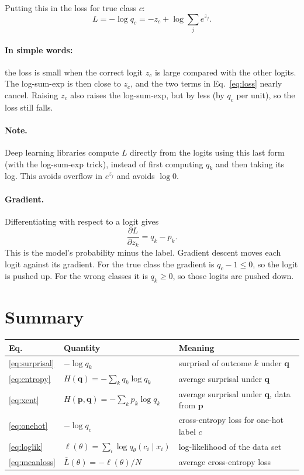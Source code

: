 \documentclass[12pt,a4paper]{article}
\begin{document}
Putting this in the loss for true class $c$:
\begin{equation}
  L = -\log q_c = -z_c + \log \sum_{j} e^{z_j} .
  \label{eq:loss}
\end{equation}
\paragraph{In simple words:} the loss is small when
the correct logit $z_c$ is large compared with the other
logits. The log-sum-exp is then close to $z_c$, and the
two terms in Eq.~\eqref{eq:loss} nearly cancel. Raising
$z_c$ also raises the log-sum-exp, but by less (by $q_c$
per unit), so the loss still falls.

\paragraph{Note.} Deep learning libraries
compute $L$ directly from the logits using this
last form (with the log-sum-exp trick), instead
of first computing $q_k$ and then taking its log.
This avoids overflow in $e^{z_j}$ and avoids $\log 0$.

\paragraph{Gradient.} Differentiating with respect to
a logit gives
\begin{equation}
  \frac{\partial L}{\partial z_k} = q_k - p_k .
  \label{eq:grad}
\end{equation}
This is the model's probability minus the label.
Gradient descent moves each logit against its gradient.
For the true class the gradient is $q_c - 1 \le 0$, so the
logit is pushed up. For the wrong classes it
is $q_k \ge 0$, so those logits are pushed down.

\section{Summary}

\begin{center}
\begin{tabular}{lll}
  \toprule
  Eq. & Quantity & Meaning \\
  \midrule
  \eqref{eq:surprisal} & $-\log q_k$ & surprisal of outcome $k$
  under $\symbf{q}$ \\
  \eqref{eq:entropy} & $H(\symbf{q}) = -\sum_k q_k \log q_k$ & average surprisal
  under $\symbf{q}$ \\
  \eqref{eq:xent} & $H(\symbf{p}, \symbf{q}) = -\sum_k p_k \log q_k$ &
    average surprisal under $\symbf{q}$, data from $\symbf{p}$ \\
  \eqref{eq:onehot} & $-\log q_c$ & cross-entropy loss for one-hot label $c$ \\
  \eqref{eq:loglik} & $\ell(\theta) = \sum_i \log q_\theta(c_i \mid x_i)$ &
    log-likelihood of the data set \\
  \eqref{eq:meanloss} & $\bar{L}(\theta) = -\ell(\theta)/N$ &
    average cross-entropy loss \\
  \bottomrule
\end{tabular}
\end{center}
\end{document}
